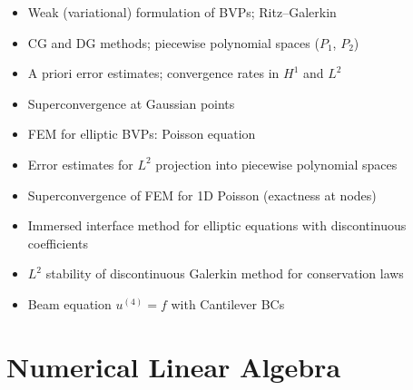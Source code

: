 \documentclass{amsart}
\begin{document}
\begin{itemize}
  \item Weak (variational) formulation of BVPs; Ritz--Galerkin
  \item CG and DG methods; piecewise polynomial spaces ($P_1$, $P_2$)
  \item A priori error estimates; convergence rates in $H^1$ and $L^2$
  \item Superconvergence at Gaussian points
  \item FEM for elliptic BVPs: Poisson equation
  \item Error estimates for $L^2$ projection into piecewise polynomial spaces
  \item Superconvergence of FEM for 1D Poisson (exactness at nodes)
  \item Immersed interface method for elliptic equations with discontinuous coefficients
  \item $L^2$ stability of discontinuous Galerkin method for conservation laws
  \item Beam equation $u^{(4)} = f$ with Cantilever BCs
\end{itemize}

\section{Numerical Linear Algebra}
\end{document}
